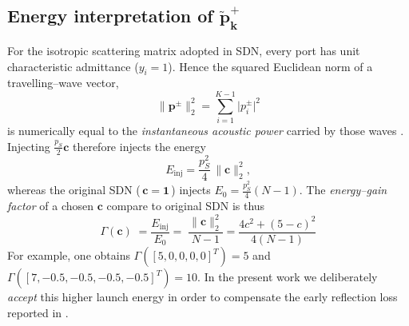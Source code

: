 \documentclass[journal]{IEEEtran}
\begin{document}
\subsection{Energy interpretation of $\mathbf{\tilde p_k^{+}}$}
For the isotropic scattering matrix adopted in SDN, every port has unit
characteristic admittance ($y_i=1$).
Hence the squared Euclidean norm of a travelling–wave vector,
%
\[
   \|\mathbf p^{\pm}\|_2^{2}
   =\sum_{i=1}^{K-1}\lvert p^{\pm}_i\rvert^{2}
\]
%
is numerically equal to the \emph{instantaneous acoustic
power} carried by those waves \cite{Julius85,SDNjournal}. Injecting
$\frac{p_{S}}{2}\mathbf c$ therefore injects the energy
\begin{equation}
   E_{\mathrm{inj}}=\frac{p_S^{2}}{4}\,\|\mathbf c\|_2^{2},
   \label{eq:E_inj_general}
\end{equation}
whereas the original SDN (\,$\mathbf c=\mathbf1$\,) injects
$E_0=\tfrac{p_S^{2}}{4}(N-1)$.  The \emph{energy–gain factor} of a
chosen $\mathbf c$ compare to original SDN is thus
\begin{equation}
   \Gamma(\mathbf c)\;= \frac{E_{\mathrm{inj}}}{E_0}=\;
      \frac{\|\mathbf c\|_2^{2}}{N-1}= \frac{4c^2+(5-c)^2}{4(N-1)}
   \label{eq:gain_factor}
\end{equation}
For example, one obtains
$\Gamma([5,0,0,0,0]^T)=5$ and
$\Gamma([7,-0.5,-0.5,-0.5,-0.5]^T)=10$. In the present work we deliberately
\emph{accept} this higher launch energy in order to compensate the
early reflection loss reported in \cite{SDNwaspaa}.


%
\end{document}
